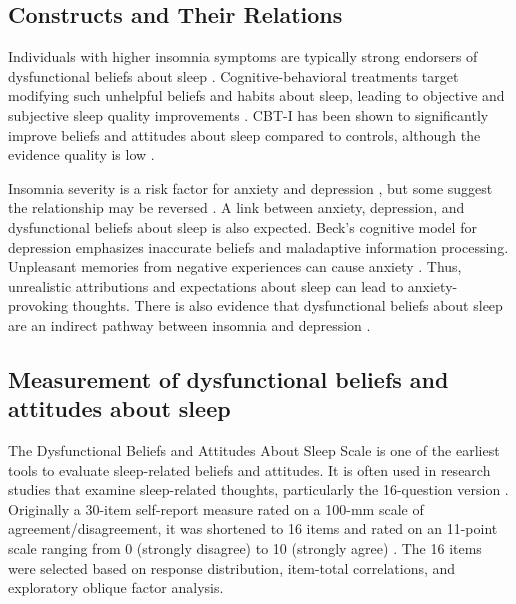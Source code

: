\documentclass[
  12pt,
  twoside,
  openright,
  a4paper,
  chapter=TITLE,
  section=TITLE,
  brazil]{abntex2}
\begin{document}
\hypertarget{constructs-and-their-relations}{%
\subsection{Constructs and Their
Relations}\label{constructs-and-their-relations}}

Individuals with higher insomnia symptoms are typically strong endorsers
of dysfunctional beliefs about sleep
\autocite{carney2006,cronlein2014,eidelman2016}. Cognitive-behavioral
treatments target modifying such unhelpful beliefs and habits about
sleep, leading to objective and subjective sleep quality improvements
\autocite{harvey2014,montserratsanchez-ortuno2010,belanger2006}. CBT-I
has been shown to significantly improve beliefs and attitudes about
sleep compared to controls, although the evidence quality is low
\autocite{edingerjackd.2021}.

Insomnia severity is a risk factor for anxiety \autocite{neckelmann2007}
and depression \autocite{blanken2020,li2016}, but some suggest the
relationship may be reversed \autocite{chen2017,jansson-frojmark2008b}.
A link between anxiety, depression, and dysfunctional beliefs about
sleep is also expected. Beck's \autocite*{beck1979cognitive} cognitive
model for depression emphasizes inaccurate beliefs and maladaptive
information processing. Unpleasant memories from negative experiences
can cause anxiety \autocite{brewin1996theoretical}. Thus, unrealistic
attributions and expectations about sleep can lead to anxiety-provoking
thoughts. There is also evidence that dysfunctional beliefs about sleep
are an indirect pathway between insomnia and depression
\autocite{sadler2013}.

\hypertarget{measurement-of-dysfunctional-beliefs-and-attitudes-about-sleep}{%
\subsection{Measurement of dysfunctional beliefs and attitudes about
sleep}\label{measurement-of-dysfunctional-beliefs-and-attitudes-about-sleep}}

The Dysfunctional Beliefs and Attitudes About Sleep Scale
\autocite[DBAS,][]{morin1993insomnia} is one of the earliest tools to
evaluate sleep-related beliefs and attitudes. It is often used in
research studies that examine sleep-related thoughts, particularly the
16-question version \autocite{thakral2020}. Originally a 30-item
self-report measure rated on a 100-mm scale of agreement/disagreement,
it was shortened to 16 items and rated on an 11-point scale ranging from
0 (strongly disagree) to 10 (strongly agree) \autocite{morin2007a}. The
16 items were selected based on response distribution, item-total
correlations, and exploratory oblique factor analysis.
\end{document}
